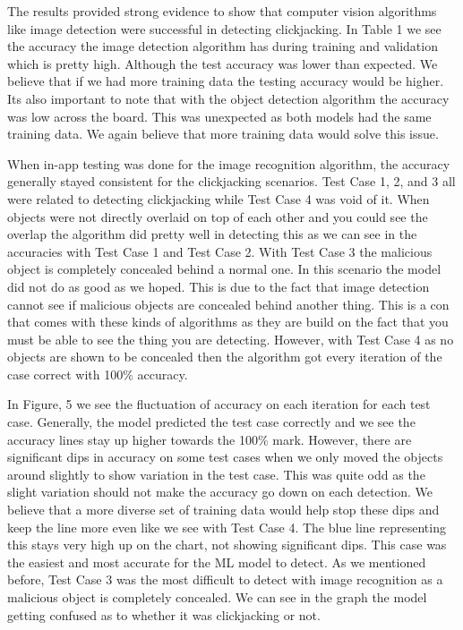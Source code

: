 \documentclass[conference]{IEEEtran}
\begin{document}
The results provided strong evidence to show that computer vision algorithms like image detection were successful in detecting clickjacking. In Table 1 we see the accuracy the image detection algorithm has during training and validation which is pretty high. Although the test accuracy was lower than expected. We believe that if we had more training data the testing accuracy would be higher. Its also important to note that with the object detection algorithm the accuracy was low across the board. This was unexpected as both models had the same training data. We again believe that more training data would solve this issue. 

When in-app testing was done for the image recognition algorithm, the accuracy generally stayed consistent for the clickjacking scenarios. Test Case 1, 2, and 3 all were related to detecting clickjacking while Test Case 4 was void of it. When objects were not directly overlaid on top of each other and you could see the overlap the algorithm did pretty well in detecting this as we can see in the accuracies with Test Case 1 and Test Case 2. With Test Case 3 the malicious object is completely concealed behind a normal one. In this scenario the model did not do as good as we hoped. This is due to the fact that image detection cannot see if malicious objects are concealed behind another thing. This is a con that comes with these kinds of algorithms as they are build on the fact that you must be able to see the thing you are detecting. However, with Test Case 4 as no objects are shown to be concealed then the algorithm got every iteration of the case correct with 100\% accuracy.

In Figure, 5 we see the fluctuation of accuracy on each iteration for each test case. Generally, the model predicted the test case correctly and we see the accuracy lines stay up higher towards the 100\% mark. However, there are significant dips in accuracy on some test cases when we only moved the objects around slightly to show variation in the test case. This was quite odd as the slight variation should not make the accuracy go down on each detection. We believe that a more diverse set of training data would help stop these dips and keep the line more even like we see with Test Case 4. The blue line representing this stays very high up on the chart, not showing significant dips. This case was the easiest and most accurate for the ML model to detect. As we mentioned before, Test Case 3 was the most difficult to detect with image recognition as a malicious object is completely concealed. We can see in the graph the model getting confused as to whether it was clickjacking or not. 
\end{document}
